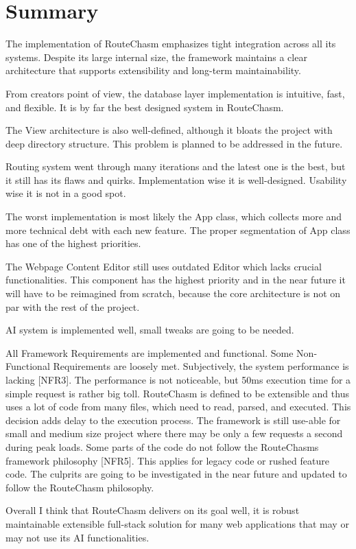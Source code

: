 \section{Summary}\label{sec:summary}
The implementation of RouteChasm emphasizes tight integration across all its systems.
Despite its large internal size, the framework maintains a clear architecture that supports extensibility
and long-term maintainability.

From creators point of view, the database layer implementation is intuitive, fast, and flexible.
It is by far the best designed system in RouteChasm.

The View architecture is also well-defined, although it bloats the project with deep directory structure.
This problem is planned to be addressed in the future.

Routing system went through many iterations and the latest one is the best, but it still has its flaws and quirks.
Implementation wise it is well-designed.
Usability wise it is not in a good spot.

The worst implementation is most likely the App class, which collects more and more technical debt with each new
feature.
The proper segmentation of App class has one of the highest priorities.

The Webpage Content Editor still uses outdated Editor which lacks crucial functionalities.
This component has the highest priority and in the near future it will have to be reimagined from scratch,
because the core architecture is not on par with the rest of the project.

AI system is implemented well, small tweaks are going to be needed.

All Framework Requirements are implemented and functional.
Some Non-Functional Requirements are loosely met.
Subjectively, the system performance is lacking [NFR3].
The performance is not noticeable, but 50ms execution time for a simple request is rather big toll.
RouteChasm is defined to be extensible and thus uses a lot of code from many files, which need to read, parsed, and
executed.
This decision adds delay to the execution process.
The framework is still use-able for small and medium size project where there may be only a few requests a second
during peak loads.
Some parts of the code do not follow the RouteChasms framework philosophy [NFR5].
This applies for legacy code or rushed feature code.
The culprits are going to be investigated in the near future and updated to follow the RouteChasm philosophy.

Overall I think that RouteChasm delivers on its goal well, it is robust maintainable extensible full-stack
solution for many web applications that may or may not use its AI functionalities.
